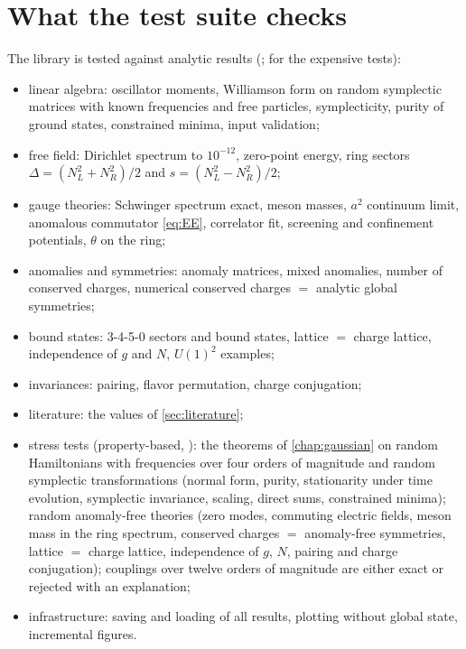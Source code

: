 \section{What the test suite checks}
The library is tested against analytic results (;  for the expensive tests):
\begin{itemize}
  \item linear algebra: oscillator moments, Williamson form on random symplectic matrices with known frequencies and
    free particles, symplecticity, purity of ground states, constrained minima, input validation;
  \item free field: Dirichlet spectrum to $10^{-12}$, zero-point energy, ring sectors
    $\Delta = (N_L^2+N_R^2)/2$ and $s = (N_L^2-N_R^2)/2$;
  \item gauge theories: Schwinger spectrum exact, meson masses, $a^2$ continuum limit, anomalous commutator
    \eqref{eq:EE}, correlator fit, screening and confinement potentials, $\theta$ on the ring;
  \item anomalies and symmetries: anomaly matrices, mixed anomalies, number of conserved charges, numerical
    conserved charges $=$ analytic global symmetries;
  \item bound states: 3-4-5-0 sectors and bound states, lattice $=$ charge lattice, independence of $g$ and $N$,
    $U(1)^2$ examples;
  \item invariances: pairing, flavor permutation, charge conjugation;
  \item literature: the values of \cref{sec:literature};
  \item stress tests (property-based, ): the theorems of \cref{chap:gaussian} on random Hamiltonians
    with frequencies over four orders of magnitude and random symplectic transformations (normal form, purity,
    stationarity under time evolution, symplectic invariance, scaling, direct sums, constrained minima); random
    anomaly-free theories (zero modes, commuting electric fields, meson mass in the ring spectrum, conserved charges
    $=$ anomaly-free symmetries, lattice $=$ charge lattice, independence of $g$, $N$, pairing and charge conjugation);
    couplings over twelve orders of magnitude are either exact or rejected with an explanation;
  \item infrastructure: saving and loading of all results, plotting without global state, incremental figures.
\end{itemize}

